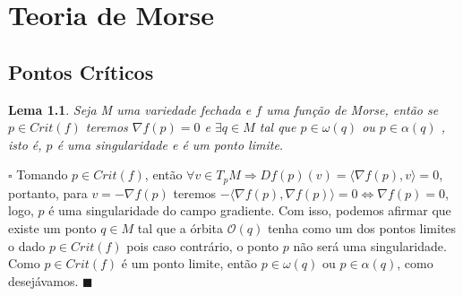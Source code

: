 \documentclass[12pt]{book}
\newtheorem{lema}[teorema]{Lema}
\newenvironment{prova}[1]{$\square$ #1}{\hfill$\blacksquare$}
\newcommand{\produtointerno}[2]{\langle #1, #2 \rangle}
\begin{document}
	\chapter{Teoria de Morse}
	
	\section{Pontos Críticos}
	\begin{lema}
		Seja M uma variedade fechada e $f$ uma função de Morse, então se $p \in Crit(f)$ teremos $\nabla f(p)=0$ e $\exists q \in M$ tal que $p \in \omega(q)$ ou $p \in \alpha(q)$ , isto é, $p$ é uma singularidade e é um ponto limite.
	\end{lema}
	\begin{prova}
		Tomando $p \in Crit(f)$, então $\forall v \in T_{p}M \Rightarrow Df(p)(v) = \produtointerno{\nabla f(p)}{v} = 0$, portanto, para $v = -\nabla f(p)$ teremos $-\produtointerno{\nabla f(p)}{\nabla f(p)} = 0 \iff \nabla f(p) = 0$, logo, $p$ é uma singularidade do campo gradiente. Com isso, podemos afirmar que existe um ponto $q \in M$ tal que a órbita $\mathcal{O}(q)$ tenha como um dos pontos limites o dado $p \in Crit(f)$ pois caso contrário, o ponto $p$ não será uma singularidade. Como $p \in Crit(f)$ é um ponto limite, então $p \in \omega(q)$ ou $p \in \alpha(q)$, como desejávamos.
	\end{prova}
	
\end{document}

